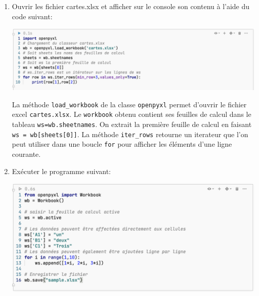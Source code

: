 \documentclass[a4paper]{article}
\begin{document}
\begin{enumerate}
\item Ouvrir les fichier cartes.xlsx et afficher sur le console son contenu à l'aide du code suivant:

\begin{center}
\includegraphics[scale=0.5]{pgm2.png} 
\end{center}


%
%

La méthode {\tt load\_workbook} de la classe {\tt openpyxl} permet d'ouvrir le fichier excel {\tt cartes.xlsx}. Le {\tt workbook} obtenu contient ses feuilles de calcul dans le tableau {\tt ws=wb.sheetnames}. On extrait la première feuille de calcul en faisant {\tt ws = wb[sheets[0]]}. La méthode {\tt iter\_rows} retourne un iterateur que l'on peut utiliser dans une boucle {\tt for} pour afficher les éléments d'une ligne courante.
\item Exécuter le programme suivant:
\begin{center}
\includegraphics[scale=0.59]{pgm25.png} 
\end{center}


%
%
%

\end{enumerate}
\end{document}
